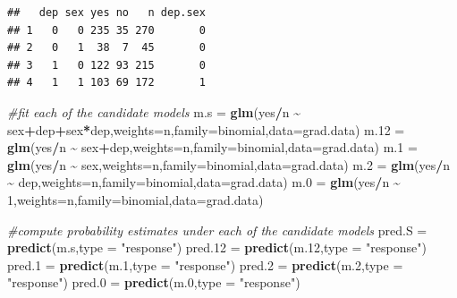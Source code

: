 \documentclass[
  11pt,
]{article}
\newenvironment{Shaded}{\begin{snugshade}}{\end{snugshade}}
\newcommand{\AttributeTok}[1]{\textcolor[rgb]{0.13,0.29,0.53}{#1}}
\newcommand{\CommentTok}[1]{\textcolor[rgb]{0.56,0.35,0.01}{\textit{#1}}}
\newcommand{\DecValTok}[1]{\textcolor[rgb]{0.00,0.00,0.81}{#1}}
\newcommand{\FloatTok}[1]{\textcolor[rgb]{0.00,0.00,0.81}{#1}}
\newcommand{\FunctionTok}[1]{\textcolor[rgb]{0.13,0.29,0.53}{\textbf{#1}}}
\newcommand{\NormalTok}[1]{#1}
\newcommand{\OtherTok}[1]{\textcolor[rgb]{0.56,0.35,0.01}{#1}}
\newcommand{\SpecialCharTok}[1]{\textcolor[rgb]{0.81,0.36,0.00}{\textbf{#1}}}
\newcommand{\StringTok}[1]{\textcolor[rgb]{0.31,0.60,0.02}{#1}}
\begin{document}
\begin{verbatim}
##   dep sex yes no   n dep.sex
## 1   0   0 235 35 270       0
## 2   0   1  38  7  45       0
## 3   1   0 122 93 215       0
## 4   1   1 103 69 172       1
\end{verbatim}

\begin{Shaded}
\begin{Highlighting}[]
\CommentTok{\#fit each of the candidate models}
\NormalTok{m.s }\OtherTok{=} \FunctionTok{glm}\NormalTok{(yes}\SpecialCharTok{/}\NormalTok{n }\SpecialCharTok{\textasciitilde{}}\NormalTok{ sex}\SpecialCharTok{+}\NormalTok{dep}\SpecialCharTok{+}\NormalTok{sex}\SpecialCharTok{*}\NormalTok{dep,}\AttributeTok{weights=}\NormalTok{n,}\AttributeTok{family=}\NormalTok{binomial,}\AttributeTok{data=}\NormalTok{grad.data)}
\NormalTok{m}\FloatTok{.12} \OtherTok{=} \FunctionTok{glm}\NormalTok{(yes}\SpecialCharTok{/}\NormalTok{n }\SpecialCharTok{\textasciitilde{}}\NormalTok{ sex}\SpecialCharTok{+}\NormalTok{dep,}\AttributeTok{weights=}\NormalTok{n,}\AttributeTok{family=}\NormalTok{binomial,}\AttributeTok{data=}\NormalTok{grad.data)}
\NormalTok{m}\FloatTok{.1} \OtherTok{=} \FunctionTok{glm}\NormalTok{(yes}\SpecialCharTok{/}\NormalTok{n }\SpecialCharTok{\textasciitilde{}}\NormalTok{ sex,}\AttributeTok{weights=}\NormalTok{n,}\AttributeTok{family=}\NormalTok{binomial,}\AttributeTok{data=}\NormalTok{grad.data)}
\NormalTok{m}\FloatTok{.2} \OtherTok{=} \FunctionTok{glm}\NormalTok{(yes}\SpecialCharTok{/}\NormalTok{n }\SpecialCharTok{\textasciitilde{}}\NormalTok{ dep,}\AttributeTok{weights=}\NormalTok{n,}\AttributeTok{family=}\NormalTok{binomial,}\AttributeTok{data=}\NormalTok{grad.data)}
\NormalTok{m}\FloatTok{.0} \OtherTok{=} \FunctionTok{glm}\NormalTok{(yes}\SpecialCharTok{/}\NormalTok{n }\SpecialCharTok{\textasciitilde{}} \DecValTok{1}\NormalTok{,}\AttributeTok{weights=}\NormalTok{n,}\AttributeTok{family=}\NormalTok{binomial,}\AttributeTok{data=}\NormalTok{grad.data)}



\CommentTok{\#compute probability estimates under each of the candidate models}
\NormalTok{pred.S }\OtherTok{=} \FunctionTok{predict}\NormalTok{(m.s,}\AttributeTok{type =} \StringTok{"response"}\NormalTok{)}
\NormalTok{pred}\FloatTok{.12} \OtherTok{=} \FunctionTok{predict}\NormalTok{(m}\FloatTok{.12}\NormalTok{,}\AttributeTok{type =} \StringTok{"response"}\NormalTok{)}
\NormalTok{pred}\FloatTok{.1} \OtherTok{=} \FunctionTok{predict}\NormalTok{(m}\FloatTok{.1}\NormalTok{,}\AttributeTok{type =} \StringTok{"response"}\NormalTok{)}
\NormalTok{pred}\FloatTok{.2} \OtherTok{=} \FunctionTok{predict}\NormalTok{(m}\FloatTok{.2}\NormalTok{,}\AttributeTok{type =} \StringTok{"response"}\NormalTok{)}
\NormalTok{pred}\FloatTok{.0} \OtherTok{=} \FunctionTok{predict}\NormalTok{(m}\FloatTok{.0}\NormalTok{,}\AttributeTok{type =} \StringTok{"response"}\NormalTok{)}
\end{Highlighting}
\end{Shaded}
\end{document}

